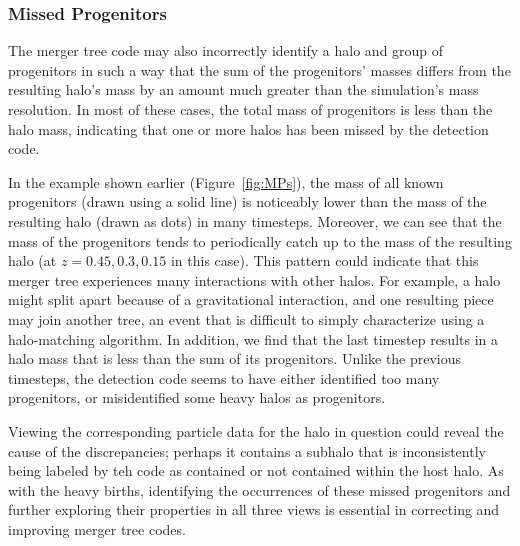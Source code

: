 \subsubsection{Missed Progenitors}

The merger tree code may also incorrectly identify a halo and group of progenitors in such a way that the sum of the progenitors' masses differs from the resulting halo's mass by an amount much greater than the simulation's mass resolution. In most of these cases, the total mass of progenitors is less than the halo mass, indicating that one or more halos has been missed by the detection code. 

In the example shown earlier (Figure~\ref{fig:MPs}), the mass of all known progenitors (drawn using a solid line) is noticeably lower than the mass of the resulting halo (drawn as dots) in many timesteps. Moreover, we can see that the mass of the progenitors tends to periodically catch up to the mass of the resulting halo (at $z = 0.45, 0.3, 0.15$ in this case). This pattern could indicate that this merger tree experiences many interactions with other halos. For example, a halo might split apart because of a gravitational interaction, and one resulting piece may join another tree, an event that is difficult to simply characterize using a halo-matching algorithm. In addition, we find that the last timestep results in a halo mass that is less than the sum of its progenitors. Unlike the previous timesteps, the detection code seems to have either identified too many progenitors, or misidentified some heavy halos as progenitors.



Viewing the corresponding particle data for the halo in question could reveal the cause of the discrepancies; perhaps it contains a subhalo that is inconsistently being labeled by teh code as contained or not contained within the host halo. As with the heavy births, identifying the occurrences of these missed progenitors and further exploring their properties in all three views is essential in correcting and improving merger tree codes. 

